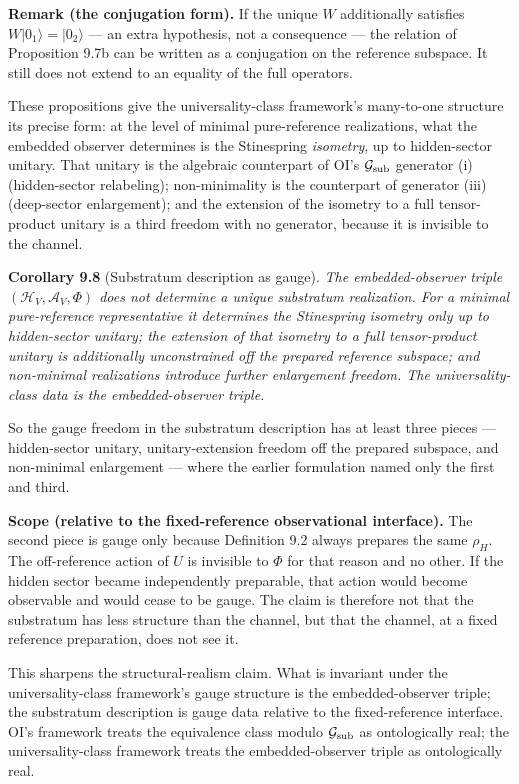 \documentclass[
]{article}
\begin{document}
\textbf{Remark (the conjugation form).} If the unique \(W\) additionally
satisfies \(W|0_1\rangle = |0_2\rangle\) --- an extra hypothesis, not a
consequence --- the relation of Proposition 9.7b can be written as a
conjugation on the reference subspace. It still does not extend to an
equality of the full operators.

These propositions give the universality-class framework's many-to-one
structure its precise form: at the level of minimal pure-reference
realizations, what the embedded observer determines is the Stinespring
\emph{isometry}, up to hidden-sector unitary. That unitary is the
algebraic counterpart of OI's \(\mathcal{G}_{\rm sub}\) generator (i)
(hidden-sector relabeling); non-minimality is the counterpart of
generator (iii) (deep-sector enlargement); and the extension of the
isometry to a full tensor-product unitary is a third freedom with no
generator, because it is invisible to the channel.

\textbf{Corollary 9.8} (Substratum description as gauge). \emph{The
embedded-observer triple \((\mathcal{H}_V, \mathcal{A}_V, \Phi)\) does
not determine a unique substratum realization. For a minimal
pure-reference representative it determines the Stinespring isometry
only up to hidden-sector unitary; the extension of that isometry to a
full tensor-product unitary is additionally unconstrained off the
prepared reference subspace; and non-minimal realizations introduce
further enlargement freedom. The universality-class data is the
embedded-observer triple.}

So the gauge freedom in the substratum description has at least three
pieces --- hidden-sector unitary, unitary-extension freedom off the
prepared subspace, and non-minimal enlargement --- where the earlier
formulation named only the first and third.

\textbf{Scope (relative to the fixed-reference observational
interface).} The second piece is gauge only because Definition 9.2
always prepares the same \(\rho_H\). The off-reference action of \(U\)
is invisible to \(\Phi\) for that reason and no other. If the hidden
sector became independently preparable, that action would become
observable and would cease to be gauge. The claim is therefore not that
the substratum has less structure than the channel, but that the
channel, at a fixed reference preparation, does not see it.

This sharpens the structural-realism claim. What is invariant under the
universality-class framework's gauge structure is the embedded-observer
triple; the substratum description is gauge data relative to the
fixed-reference interface. OI's framework treats the equivalence class
modulo \(\mathcal{G}_{\rm sub}\) as ontologically real; the
universality-class framework treats the embedded-observer triple as
ontologically real.
\end{document}
